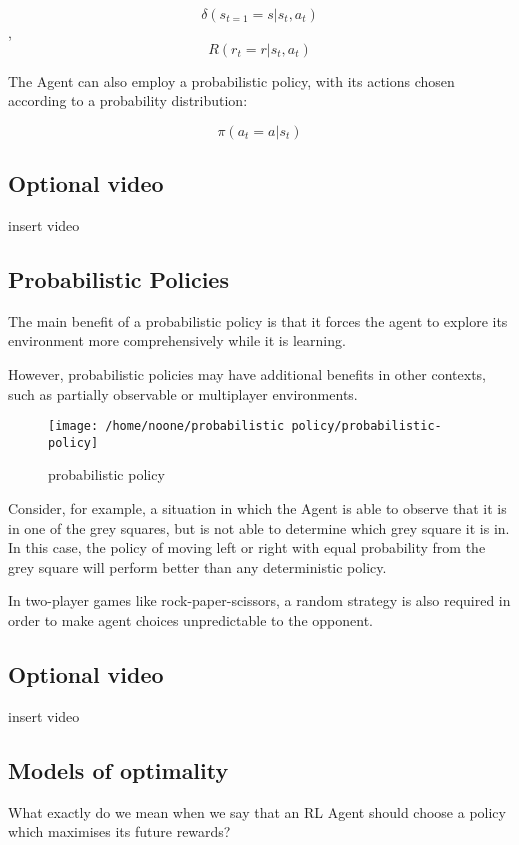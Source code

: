 \documentclass[11pt]{article}
\begin{document}
\[\delta (s_{t = 1} = s | s_t, a_t)\], \[R (r_t = r | s_t, a_t)\]

The Agent can also employ a probabilistic policy, with its actions chosen
according to a probability distribution:

\[\pi (a_t = a | s_t)\]

\subsection{Optional video}\label{subsec:optional-video}
insert video

\subsection{Probabilistic Policies}\label{subsec:probabilistic-policies}
The main benefit of a probabilistic policy is that it forces the agent to
explore its environment more comprehensively while it is learning.

However, probabilistic policies may have additional benefits in other contexts,
such as partially observable or multiplayer environments.

\begin{figure}[h]
    \centering
    \texttt{[image: /home/noone/probabilistic policy/probabilistic-policy]}
    \caption[probabilistic policy]{probabilistic policy}
    \label{fig:probabilistic policy}
\end{figure}

Consider, for example, a situation in which the Agent is able to observe that
it is in one of the grey squares, but is not able to determine which grey
square it is in.
In this case, the policy of moving left or right with equal probability from
the grey square will perform better than any deterministic policy.

In two-player games like rock-paper-scissors, a random strategy is also
required in order to make agent choices unpredictable to the opponent.

\subsection{Optional video}\label{subsec:optional-video2}
insert video

\subsection{Models of optimality}\label{subsec:models-of-optimality}
What exactly do we mean when we say that an RL Agent should choose a policy
which maximises its future rewards?
\end{document}
